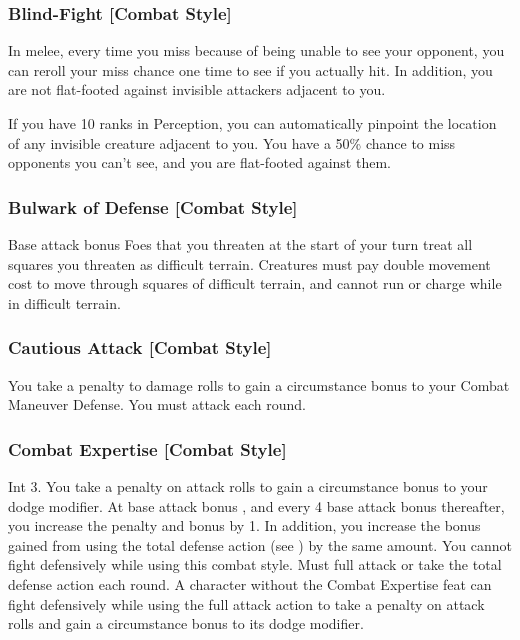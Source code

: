 \subsubsection{Blind-Fight [Combat Style]}
 In melee, every time you miss because of being unable to see your opponent, you can reroll your miss chance one time to see if you actually hit. In addition, you are not flat-footed against invisible attackers adjacent to you.
\par If you have 10 ranks in Perception, you can automatically pinpoint the location of any invisible creature adjacent to you. 
 You have a 50\% chance to miss opponents you can't see, and you are flat-footed against them.

\subsubsection{Bulwark of Defense [Combat Style]}
 Base attack bonus 
 Foes that you threaten at the start of your turn treat all squares you threaten as difficult terrain. Creatures must pay double movement cost to move through squares of difficult terrain, and cannot run or charge while in difficult terrain.

\subsubsection{Cautious Attack [Combat Style]}
 You take a  penalty to damage rolls to gain a  circumstance bonus to your Combat Maneuver Defense. \babscalingdescription
{} You must attack each round.

\subsubsection{Combat Expertise [Combat Style]}
 Int 3.
 You take a  penalty on attack rolls to gain a  circumstance bonus to your dodge modifier. At base attack bonus , and every 4 base attack bonus thereafter, you increase the penalty and bonus by 1. In addition, you increase the bonus gained from using the total defense action (see ) by the same amount. You cannot fight defensively while using this combat style.
 Must full attack or take the total defense action each round.
 A character without the Combat Expertise feat can fight defensively while using the full attack action to take a  penalty on attack rolls and gain a  circumstance bonus to its dodge modifier.

